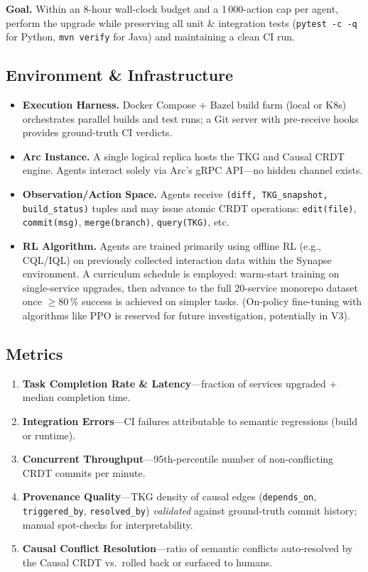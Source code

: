 \documentclass{article}
\begin{document}
\smallskip
\noindent\textbf{Goal.}
Within an 8-hour wall-clock budget and a 1\,000-action cap per agent, perform the upgrade while preserving all unit $\&$ integration tests (\texttt{pytest -c -q} for Python, \texttt{mvn verify} for Java) and maintaining a clean CI run.

\subsection{Environment \& Infrastructure}
\begin{itemize}
    \item \textbf{Execution Harness.} Docker Compose + Bazel build farm (local or K8s) orchestrates parallel builds and test runs; a Git server with pre-receive hooks provides ground-truth CI verdicts.
    \item \textbf{Arc Instance.} A single logical replica hosts the TKG and Causal CRDT engine.  Agents interact solely via Arc’s gRPC API—no hidden channel exists.
    \item \textbf{Observation/Action Space.}
          Agents receive \texttt{(diff, TKG\_snapshot, build\_status)} tuples and may issue atomic CRDT operations: \texttt{edit(file)}, \texttt{commit(msg)}, \texttt{merge(branch)}, \texttt{query(TKG)}, etc.
    \item \textbf{RL Algorithm.} Agents are trained primarily using offline RL (e.g., CQL/IQL) on previously collected interaction data within the Synapse environment. A curriculum schedule is employed: warm-start training on single-service upgrades, then advance to the full 20-service monorepo dataset once $\ge$80\,\% success is achieved on simpler tasks. (On-policy fine-tuning with algorithms like PPO is reserved for future investigation, potentially in V3).
\end{itemize}

\subsection{Metrics}
\begin{enumerate}
    \item \textbf{Task Completion Rate \& Latency}—fraction of services upgraded + median completion time.
    \item \textbf{Integration Errors}—CI failures attributable to semantic regressions (build or runtime).
    \item \textbf{Concurrent Throughput}—95th-percentile number of non-conflicting CRDT commits per minute.
    \item \textbf{Provenance Quality}—TKG density of causal edges (\verb|depends_on|, \verb|triggered_by|, \verb|resolved_by|) \emph{validated} against ground-truth commit history; manual spot-checks for interpretability.
    \item \textbf{Causal Conflict Resolution}—ratio of semantic conflicts auto-resolved by the Causal CRDT vs.\ rolled back or surfaced to humans.
\end{enumerate}
\end{document}
